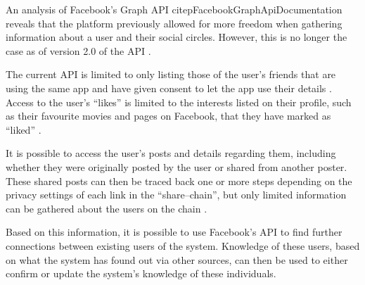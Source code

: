 An analysis of Facebook's Graph \ac{API} citep{FacebookGraphApiDocumentation}
reveals that the platform previously allowed for more freedom when gathering
information about a user and their social circles. However, this is no longer
the case as of version 2.0 of the \ac{API}
\citep{FacebookChangesInGraphTwoPointOh}.

The current \ac{API} is limited to only listing those of the user's friends
that are using the same app and have given consent to let the app use their
details \citep{FacebookChangesInGraphTwoPointOh}. Access to the user's ``likes''
is limited to the interests listed on their profile, such as their favourite
movies and pages on Facebook, that they have marked as ``liked''
\citep{FacebookGraphApiUserLikes} \citep{FacebookGraphApiUserEdges}.\nl

It is possible to access the user's posts and details regarding them,
including whether they were originally posted by the user or shared from
another poster. These shared posts can then be traced back one or more steps
depending on the privacy settings of each link in the ``share--chain'', but
only limited information can be gathered about the users on the chain
\citep{FacebookGraphApiUserFeed}.\nl

Based on this information, it is possible to use Facebook's \ac{API} to find
further connections between existing users of the system.
Knowledge of these users, based on what the system has found out via other
sources, can then be used to either confirm or update the system's knowledge of
these individuals.